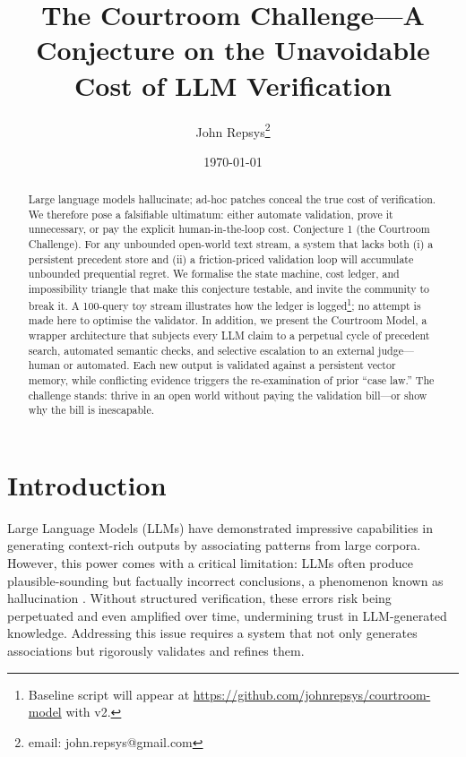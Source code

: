 \documentclass[11pt]{article}
\title{The Courtroom Challenge—A Conjecture on the Unavoidable Cost of LLM Verification}
\author{John Repsys\thanks{email: john.repsys@gmail.com}}
\date{\today}
\begin{document}
\maketitle
\begin{abstract}
  Large language models hallucinate; ad-hoc patches conceal the true cost of verification. 
  We therefore pose a falsifiable ultimatum: either automate validation, prove it unnecessary, or pay the explicit human-in-the-loop cost.  
  Conjecture 1 (the Courtroom Challenge). 
  For any unbounded open-world text stream, a system that lacks both (i) a persistent precedent store and (ii) a friction-priced validation loop will accumulate unbounded prequential regret.
  We formalise the state machine, cost ledger, and impossibility triangle that make this conjecture testable, and invite the community to break it.
  A 100-query toy stream illustrates how the ledger is logged\footnote{Baseline script will appear at \url{https://github.com/johnrepsys/courtroom-model} with v2.}; no attempt is made here to optimise the validator.
  In addition, we present the Courtroom Model, a wrapper architecture that subjects every LLM claim to a perpetual cycle of precedent search, automated semantic checks, and selective escalation to an external judge—human or automated.
  Each new output is validated against a persistent vector memory, while conflicting evidence triggers the re-examination of prior “case law.”
  The challenge stands: thrive in an open world without paying the validation bill—or show why the bill is inescapable.
\end{abstract}


\section{Introduction}
\label{sec:intro}
Large Language Models (LLMs) have demonstrated impressive capabilities in generating context-rich outputs by associating patterns from large corpora. However, this power comes with a critical limitation: LLMs often produce plausible-sounding but factually incorrect conclusions, a phenomenon known as hallucination \citep{marcus2020nextdecade,shinn2023reflexion}. Without structured verification, these errors risk being perpetuated and even amplified over time, undermining trust in LLM-generated knowledge. Addressing this issue requires a system that not only generates associations but rigorously validates and refines them.
\end{document}
